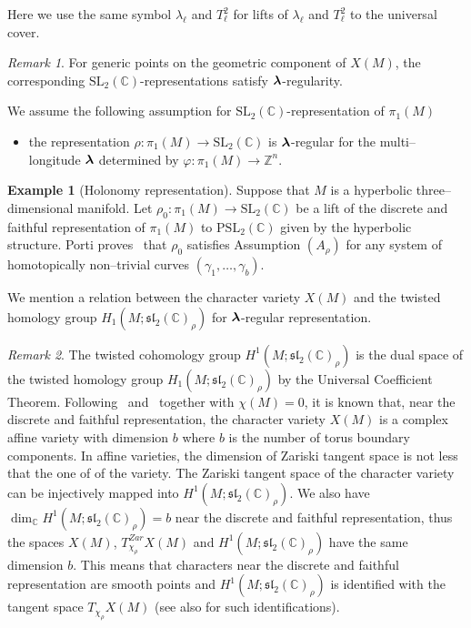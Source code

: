 \documentclass[a4paper]{amsart}
\theoremstyle{plain}
\theoremstyle{definition}
\newtheorem{example}{Example}%
\theoremstyle{remark}
\newtheorem{remark}{Remark}%
\newcommand{\ZZ}{{\mathbb Z}}
\newcommand{\CC}{{\mathbb C}}
\newcommand{\SL}{{\mathrm{SL}_2(\CC)}}
\newcommand{\bm}[1]{\mbox{\boldmath $#1$}}
\newcommand{\sllrho}{\mathfrak{sl}_2(\CC)_\rho}
\begin{document}
Here we use the same symbol $\lambda_\ell$ and $T^2_\ell$ for lifts of $\lambda_\ell$ and $T^2_\ell$ to the universal cover.

\begin{remark}
  For generic points on the geometric component of $X(M)$, the
  corresponding $\SL$-representations satisfy
  $\bm{\lambda}$-regularity.
\end{remark}
  
We assume the following assumption for $\SL$-representation of
$\pi_1(M)$
\begin{itemize}
\item[$(A_\rho)$] the representation $\rho\colon \pi_1(M) \to \SL$ is
  $\bm{\lambda}$-regular for the multi--longitude $\bm{\lambda}$ determined by $\varphi \colon \pi_1(M) \to \ZZ^n$.
\end{itemize}

\begin{example}[Holonomy representation]\label{ex:holonomy}
  Suppose that $M$ is a hyperbolic three--di\-men\-sio\-nal manifold. Let
  $\rho_0\colon \pi_1(M) \to \SL$ be a lift of the
  discrete and faithful representation of $\pi_1(M)$ to
  $\mathrm{PSL}_2(\CC)$ given by the hyperbolic structure. Porti
  proves~\cite{Porti:1997} that $\rho_0$ satisfies Assumption
  $(A_\rho)$ for any system of homotopically non--trivial curves $(\gamma_1, \ldots,
  \gamma_b)$.
 \end{example}

We mention a relation between the character variety $X(M)$ and the
twisted homology group $H_1(M;\sllrho)$ for $\bm \lambda$-regular representation.  
\begin{remark}
  The twisted cohomology group $H^1(M;\sllrho)$ is the dual space of
  the twisted homology group $H_1(M;\sllrho)$ by the Universal
  Coefficient Theorem.  Following~\cite{TN} and~\cite[Proposition
  3.2.1]{CS:1983} together with $\chi(M)=0$, it is known that, near
  the discrete and faithful representation, the character variety
  $X(M)$ is a complex affine variety with dimension $b$ where $b$ is
  the number of torus boundary components.  In affine varieties, the
  dimension of Zariski tangent space is not less that the one of
  of the variety.  The Zariski tangent space of the character variety
  can be injectively mapped into $H^1(M;\sllrho)$.  We also have 
  $\dim_{\CC} H^1(M;\sllrho) = b$ near the discrete and faithful
  representation, thus the spaces $X(M)$, $T^{Zar}_{\chi_\rho}X(M)$
  and $H^1(M;\sllrho)$ have the same dimension $b$.  This means that
  characters near the discrete and faithful representation are
  smooth points and $H^1(M;\sllrho)$ is identified with the tangent
  space $T_{\chi_\rho}X(M)$ (see also \cite[Chapter 3]{Porti:1997} for
  such identifications).
\end{remark}
\end{document}
